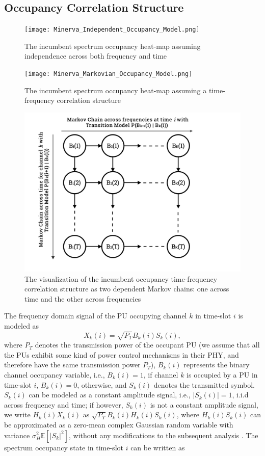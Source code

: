 \documentclass[12pt, draftcls, onecolumn]{IEEEtran}
\begin{document}
\subsection{Occupancy Correlation Structure}\label{I.II}
\begin{figure} [htb]
    \centerline{
    \texttt{[image: Minerva\_Independent\_Occupancy\_Model.png]}}
    \caption{The incumbent spectrum occupancy heat-map assuming independence across both frequency and time}
    \label{fig:A.1}
\end{figure}
\begin{figure} [htb]
    \centerline{
    \texttt{[image: Minerva\_Markovian\_Occupancy\_Model.png]}}
    \caption{The incumbent spectrum occupancy heat-map assuming a time-frequency correlation structure}
    \label{fig:A.2}
\end{figure}
\begin{figure} [htb]
    \centerline{
    \includegraphics[width = 1.0\textwidth]{MarkovChainsVisualization.png}}
    \caption{The visualization of the incumbent occupancy time-frequency correlation structure as two dependent Markov chains: one across time and the other across frequencies}
    \label{fig:A.3}
\end{figure}
The frequency domain signal of the PU occupying channel $k$ in time-slot $i$ is modeled as
\begin{equation}\label{3}
    X_{k}(i)=\sqrt{P_{T}}B_{k}(i)S_{k}(i),
\end{equation}
where $P_{T}$ denotes the transmission power of the occupant PU (we assume that all the PUs exhibit some kind of power control mechanisms in their PHY, and therefore have the same transmission power $P_{T}$), $B_{k}(i)$ represents the binary channel occupancy variable, i.e., $B_{k}(i){=}1$, if channel $k$ is occupied by a PU in time-slot $i$, $B_{k}(i){=}0$, otherwise, and $S_{k}(i)$ denotes the transmitted symbol. $S_{k}(i)$ can be modeled as a constant amplitude signal, i.e., $|S_{k}(i)|{=}1$, i.i.d across frequency and time; if however, $S_{k}(i)$ is not a constant amplitude signal, we write $H_{k}(i)X_{k}(i)$ as $\sqrt{P_{T}}B_{k}(i)H_{k}(i)S_{k}(i)$, where $H_{k}(i)S_{k}(i)$ can be approximated as a zero-mean complex Gaussian random variable with variance $\sigma_{H}^{2}\mathbb{E}[|S_{k}|^{2}]$, without any modifications to the subsequent analysis \cite{WCL:paper}. The spectrum occupancy state in time-slot $i$ can be written as
\end{document}
